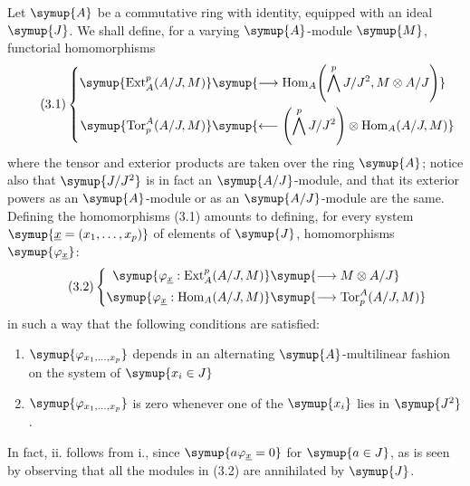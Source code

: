 
Let $\symup{A}$ be a commutative ring with identity, equipped with an ideal $\symup{J}$. We shall define, for a
varying $\symup{A}$-module $\symup{M}$, functorial homomorphisms
\begin{equation}\tag{3.1}
\left\{
\begin{aligned}\symup{\operatorname{Ext}_{A}^{p}(A/J,M)}&\symup{\longrightarrow
  \operatorname{Hom}_{A}\!\left(\bigwedge^{p}J/J^{2},M\otimes A/J\right)}\\\symup{\operatorname{Tor}_{p}^{A}(A/J,M)}&\symup{\longleftarrow
  \left(\bigwedge^{p}J/J^{2}\right)
  \otimes\operatorname{Hom}_{A}(A/J,M)}\end{aligned}
\right.
\end{equation}
where the tensor and exterior products are taken over the ring $\symup{A}$; notice also
that $\symup{J/J^{2}}$ is in fact an $\symup{A/J}$-module, and that its exterior powers as an
$\symup{A}$-module or as an $\symup{A/J}$-module are the same. Defining the homomorphisms (3.1)
amounts to defining, for every system
$\symup{\underline{x}=(x_1,\ldots,x_p)}$ of elements of $\symup{J}$, homomorphisms
$\symup{\varphi_{\underline{x}}}$:
\begin{equation}\tag{3.2}
\left\{
\begin{aligned}\symup{\varphi_{\underline{x}}:
  \operatorname{Ext}_{A}^{p}(A/J,M)}&\symup{\longrightarrow M\otimes A/J}\\\symup{\varphi_{\underline{x}}:
  \operatorname{Hom}_{A}(A/J,M)}&\symup{\longrightarrow
  \operatorname{Tor}_{p}^{A}(A/J,M)}\end{aligned}
\right.
\end{equation}
in such a way that the following conditions are satisfied:

\begin{enumerate}
\item[\textup{i.}] $\symup{\varphi_{x_1,\ldots,x_p}}$ depends in an alternating
$\symup{A}$-multilinear fashion on the system of $\symup{x_i\in J}$
\item[\textup{ii.}] $\symup{\varphi_{x_1,\ldots,x_p}}$ is zero whenever one of the
$\symup{x_i}$ lies in $\symup{J^{2}}$.
\end{enumerate}
In fact, ii. follows from i., since $\symup{a\varphi_{\underline{x}}=0}$ for $\symup{a\in J}$, as
is seen by observing that all the modules in (3.2) are annihilated by $\symup{J}$.

